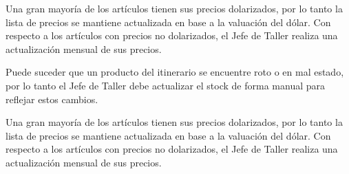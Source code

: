 \documentclass[12pt]{extarticle}
\begin{document}
\begin{spacing}{1.2}
    Una gran mayoría de los artículos tienen sus precios dolarizados, por lo tanto la lista de precios se mantiene actualizada en base a la valuación del dólar. Con respecto a los artículos con precios no dolarizados, el Jefe de Taller realiza una actualización mensual de sus precios.
    
    
    \pagebreak

    Puede suceder que un producto del itinerario se encuentre roto o en mal estado, por lo tanto el Jefe de Taller debe actualizar el stock de forma manual para reflejar estos cambios.

    Una gran mayoría de los artículos tienen sus precios dolarizados, por lo tanto la lista de precios se mantiene actualizada en base a la valuación del dólar. Con respecto a los artículos con precios no dolarizados, el Jefe de Taller realiza una actualización mensual de sus precios.
    
    
    \pagebreak


\end{spacing}
\end{document}
